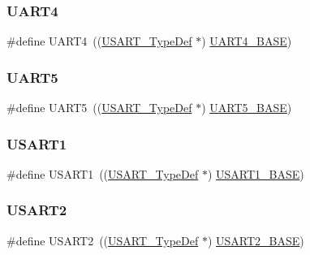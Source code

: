 \subsubsection{\texorpdfstring{UART4}{UART4}}
{\footnotesize\ttfamily \#define U\+A\+R\+T4~((\mbox{\hyperlink{struct_u_s_a_r_t___type_def}{U\+S\+A\+R\+T\+\_\+\+Type\+Def}} $\ast$) \mbox{\hyperlink{group___peripheral__memory__map_ga94d92270bf587ccdc3a37a5bb5d20467}{U\+A\+R\+T4\+\_\+\+B\+A\+SE}})}

\mbox{\label{group___peripheral__declaration_ga9274e37cf5e8a174fc5dd627b98ec0fe}} 
\subsubsection{\texorpdfstring{UART5}{UART5}}
{\footnotesize\ttfamily \#define U\+A\+R\+T5~((\mbox{\hyperlink{struct_u_s_a_r_t___type_def}{U\+S\+A\+R\+T\+\_\+\+Type\+Def}} $\ast$) \mbox{\hyperlink{group___peripheral__memory__map_gaa155689c0e206e6994951dc3cf31052a}{U\+A\+R\+T5\+\_\+\+B\+A\+SE}})}

\mbox{\label{group___peripheral__declaration_ga92871691058ff7ccffd7635930cb08da}} 
\subsubsection{\texorpdfstring{USART1}{USART1}}
{\footnotesize\ttfamily \#define U\+S\+A\+R\+T1~((\mbox{\hyperlink{struct_u_s_a_r_t___type_def}{U\+S\+A\+R\+T\+\_\+\+Type\+Def}} $\ast$) \mbox{\hyperlink{group___peripheral__memory__map_ga86162ab3f740db9026c1320d46938b4d}{U\+S\+A\+R\+T1\+\_\+\+B\+A\+SE}})}

\mbox{\label{group___peripheral__declaration_gaf114a9eab03ca08a6fb720e511595930}} 
\subsubsection{\texorpdfstring{USART2}{USART2}}
{\footnotesize\ttfamily \#define U\+S\+A\+R\+T2~((\mbox{\hyperlink{struct_u_s_a_r_t___type_def}{U\+S\+A\+R\+T\+\_\+\+Type\+Def}} $\ast$) \mbox{\hyperlink{group___peripheral__memory__map_gade83162a04bca0b15b39018a8e8ec090}{U\+S\+A\+R\+T2\+\_\+\+B\+A\+SE}})}

